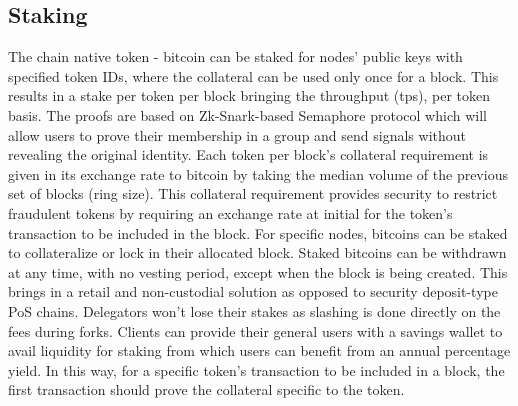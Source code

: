 \documentclass[a4paper,	10pt]{extarticle}
\begin{document}
\subsection{Staking}
The chain native token - bitcoin can be staked for nodes' public keys with specified token IDs, where the collateral can be used only once for a block. This results in a stake per token per block bringing the throughput (tps), per token basis. The proofs are based on Zk-Snark-based Semaphore protocol \cite{semaphore} which will allow users to prove their membership in a group and send signals without revealing the original identity. Each token per block's collateral requirement is given in its exchange rate to bitcoin by taking the median volume of the previous set of blocks (ring size). This collateral requirement provides security to restrict fraudulent tokens by requiring an exchange rate at initial for the token's transaction to be included in the block. For specific nodes, bitcoins can be staked to collateralize or lock in their allocated block. Staked bitcoins can be withdrawn at any time, with no vesting period, except when the block is being created. This brings in a retail and non-custodial solution as opposed to security deposit-type PoS chains. Delegators won't lose their stakes as slashing is done directly on the fees during forks. Clients can provide their general users with a savings wallet to avail liquidity for staking from which users can benefit from an annual percentage yield. In this way, for a specific token's transaction to be included in a block, the first transaction should prove the collateral specific to the token.
\end{document}
